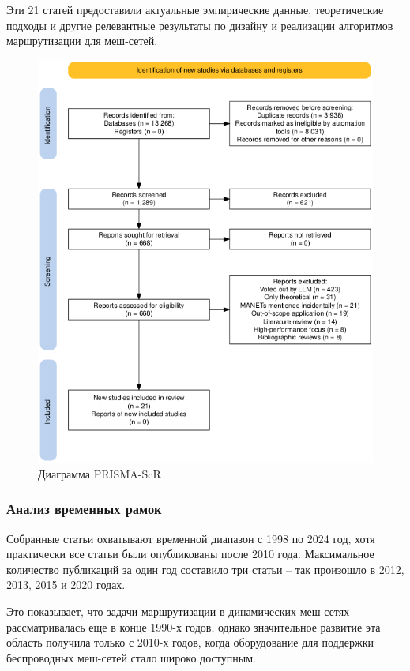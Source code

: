 \documentclass[%
]{report}
\begin{document}
Эти 21 статей предоставили актуальные эмпирические данные,
теоретические подходы и другие релевантные результаты
по дизайну и реализации алгоритмов маршрутизации для меш-сетей.

\begin{figure}
\centering
\includegraphics[width=0.8\pagewidth]{./assets/prisma.png}
\caption{Диаграмма PRISMA-ScR}
\end{figure}

\subsubsection{Анализ временных рамок}\label{timeframe-analysis}

Собранные статьи охватывают временной диапазон
с 1998 по 2024 год,
хотя практически все статьи были опубликованы после 2010 года.
Максимальное количество публикаций за один
год составило три статьи --
так произошло в 2012, 2013, 2015 и 2020 годах.

Это показывает,
что задачи маршрутизации в динамических меш-сетях рассматривалась
еще в конце 1990-х годов,
однако значительное развитие эта область получила
только с 2010-х годов,
когда оборудование для поддержки беспроводных
меш-сетей стало широко доступным.
\end{document}
